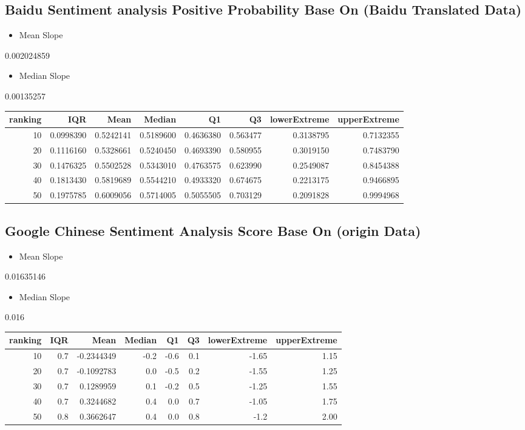 \documentclass[conference,compsoc]{IEEEtran}
\begin{document}
\subsection{Baidu Sentiment analysis Positive Probability Base On (Baidu Translated Data)}
\label{sec:org4c768b6}
\begin{itemize}
\item Mean Slope
\end{itemize}
0.002024859
\begin{itemize}
\item Median Slope
\end{itemize}
0.00135257
\begin{center}
\begin{tabular}{rrrrrrrr}
ranking & IQR & Mean & Median & Q1 & Q3 & lowerExtreme & upperExtreme\\
\hline
10 & 0.0998390 & 0.5242141 & 0.5189600 & 0.4636380 & 0.563477 & 0.3138795 & 0.7132355\\
20 & 0.1116160 & 0.5328661 & 0.5240450 & 0.4693390 & 0.580955 & 0.3019150 & 0.7483790\\
30 & 0.1476325 & 0.5502528 & 0.5343010 & 0.4763575 & 0.623990 & 0.2549087 & 0.8454388\\
40 & 0.1813430 & 0.5819689 & 0.5544210 & 0.4933320 & 0.674675 & 0.2213175 & 0.9466895\\
50 & 0.1975785 & 0.6009056 & 0.5714005 & 0.5055505 & 0.703129 & 0.2091828 & 0.9994968\\
\end{tabular}
\end{center}
\subsection{Google Chinese Sentiment Analysis Score Base On (origin Data)}
\begin{itemize}
\item Mean Slope
\end{itemize}
0.01635146
\begin{itemize}
\item Median Slope
\end{itemize}
0.016
\begin{center}
\begin{tabular}{rrrrrrrr}
ranking & IQR & Mean & Median & Q1 & Q3 & lowerExtreme & upperExtreme\\
\hline
10 & 0.7 & -0.2344349 & -0.2 & -0.6 & 0.1  & -1.65 & 1.15 \\
20 & 0.7 & -0.1092783 & 0.0 & -0.5 & 0.2 & -1.55 & 1.25 \\
30 & 0.7 & 0.1289959 & 0.1 & -0.2 & 0.5 & -1.25 & 1.55 \\
40 & 0.7 & 0.3244682 & 0.4  & 0.0 & 0.7 & -1.05 & 1.75 \\
50 & 0.8 & 0.3662647 & 0.4 & 0.0 & 0.8 & -1.2 & 2.00 \\
\end{tabular}
\end{center}
\end{document}
